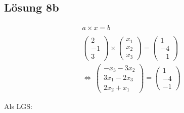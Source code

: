 \subsection{Lösung 8b}
\begin{gather*}
  a\times x=b\\
  \\
  \begin{pmatrix}
    2\\
    -1\\
    3
  \end{pmatrix} \times \begin{pmatrix}
    x_{1}\\
    x_{2}\\
    x_{3}
  \end{pmatrix} =\begin{pmatrix}
    1\\
    -4\\
    -1
  \end{pmatrix}\\
  \Leftrightarrow \ \begin{pmatrix}
    -x_{3} -3x_{2}\\
    3x_{1} -2x_{3}\\
    2x_{2} +x_{1}
  \end{pmatrix} =\begin{pmatrix}
    1\\
    -4\\
    -1
  \end{pmatrix}
\end{gather*}

Als LGS:


